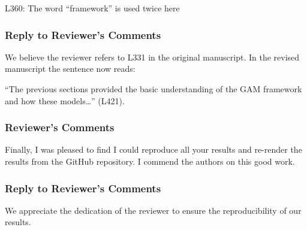 \documentclass[
]{article}
\begin{document}
L360: The word ``framework'' is used twice here

\hypertarget{section-46}{%
\subsubsection{\texorpdfstring{\textcolor{reviewersblue} {Reply to Reviewer's Comments}}{}}\label{section-46}}

We believe the reviewer refers to L331 in the original manuscript. In the revised manuscript the sentence now reads:

``The previous sections provided the basic understanding of the GAM framework and how these models\ldots{}'' (L421).

\hypertarget{reviewers-comments-43}{%
\subsubsection{Reviewer's Comments}\label{reviewers-comments-43}}

Finally, I was pleased to find I could reproduce all your results and re-render the results from the GitHub repository. I commend the authors on this good work.

\hypertarget{section-47}{%
\subsubsection{\texorpdfstring{\textcolor{reviewersblue} {Reply to Reviewer's Comments}}{}}\label{section-47}}

We appreciate the dedication of the reviewer to ensure the reproducibility of our results.
\end{document}
